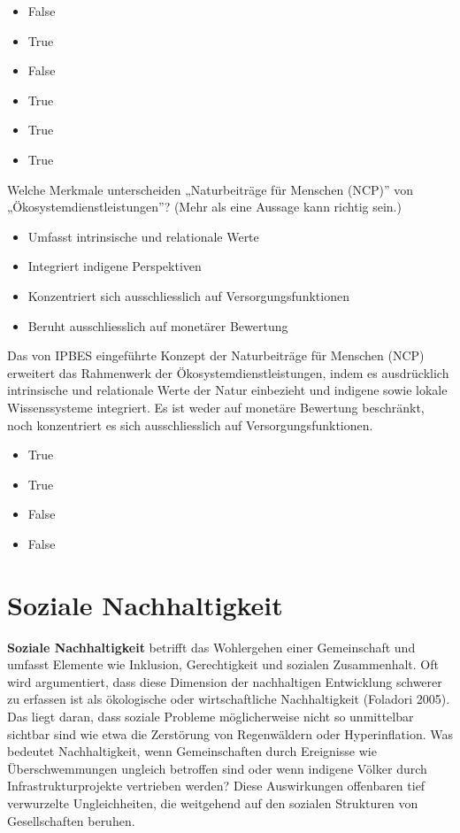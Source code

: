 \documentclass[
  nswissgerman,
  a4paper,
  DIV=11,
  numbers=noendperiod,
  oneside,
  openany]{scrreprt}
\providecommand{\tightlist}{%
  \setlength{\itemsep}{0pt}\setlength{\parskip}{0pt}}
\begin{document}
\begin{itemize}
\tightlist
\item
  False
\item
  True
\item
  False
\item
  True
\item
  True
\item
  True
\end{itemize}

Welche Merkmale unterscheiden „Naturbeiträge für Menschen (NCP)'' von
„Ökosystemdienstleistungen''? (Mehr als eine Aussage kann richtig sein.)

\begin{itemize}
\tightlist
\item[$\square$]
  Umfasst intrinsische und relationale Werte
\item[$\square$]
  Integriert indigene Perspektiven
\item[$\square$]
  Konzentriert sich ausschliesslich auf Versorgungsfunktionen
\item[$\square$]
  Beruht ausschliesslich auf monetärer Bewertung
\end{itemize}

Das von IPBES eingeführte Konzept der Naturbeiträge für Menschen (NCP)
erweitert das Rahmenwerk der Ökosystemdienstleistungen, indem es
ausdrücklich intrinsische und relationale Werte der Natur einbezieht und
indigene sowie lokale Wissenssysteme integriert. Es ist weder auf
monetäre Bewertung beschränkt, noch konzentriert es sich ausschliesslich
auf Versorgungsfunktionen.

\begin{itemize}
\tightlist
\item
  True
\item
  True
\item
  False
\item
  False
\end{itemize}

\chapter{Soziale Nachhaltigkeit}\label{soziale-nachhaltigkeit}

\textbf{Soziale Nachhaltigkeit} betrifft das Wohlergehen einer
Gemeinschaft und umfasst Elemente wie Inklusion, Gerechtigkeit und
sozialen Zusammenhalt. Oft wird argumentiert, dass diese Dimension der
nachhaltigen Entwicklung schwerer zu erfassen ist als ökologische oder
wirtschaftliche Nachhaltigkeit (Foladori 2005). Das liegt daran, dass
soziale Probleme möglicherweise nicht so unmittelbar sichtbar sind wie
etwa die Zerstörung von Regenwäldern oder Hyperinflation. Was bedeutet
Nachhaltigkeit, wenn Gemeinschaften durch Ereignisse wie
Überschwemmungen ungleich betroffen sind oder wenn indigene Völker durch
Infrastrukturprojekte vertrieben werden? Diese Auswirkungen offenbaren
tief verwurzelte Ungleichheiten, die weitgehend auf den sozialen
Strukturen von Gesellschaften beruhen.
\end{document}
